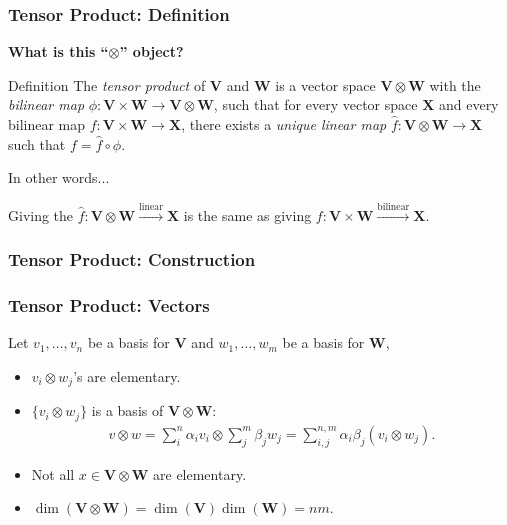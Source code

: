 \documentclass{beamer}
\theoremstyle{definition}
\newcommand{\V}{\mathbf{V}}
\newcommand{\W}{\mathbf{W}}
\newcommand{\X}{\mathbf{X}}
\newcommand{\lin}{\overset{\text{linear}}{\longrightarrow}}
\begin{document}
\begin{frame}


\frametitle{Tensor Product: Definition}	

\textbf{What is this ``$\otimes$'' object?}

\begin{block}{Definition \cite{Tor}}
The \textit{tensor product} of $\V$ and $\W$ is a vector space $\V \otimes \W$ with the \textit{bilinear map} $\phi : \V\times \W \longrightarrow \V\otimes \W$, such that for every vector space $\X$ and every bilinear map $f : \V \times \W \longrightarrow \X$, there exists a \textit{unique linear map} $\hat{f} : \V\otimes \W \longrightarrow \X$ such that $f = \hat{f} \circ \phi$.
\end{block}


\begin{block}{In other words...}

Giving the $\hat{f} : \V\otimes \W \lin \X$ is the same as giving $f : \V\times \W \stackrel{\text{bilinear}}{\longrightarrow} \X$.


\end{block}




\end{frame}


\begin{frame}[fragile]
\frametitle{Tensor Product: Construction}
\centering
\begin{center}
\end{center}
\end{frame}








\begin{frame}
\frametitle{Tensor Product: Vectors \tiny{\cite{cern}}}
Let $v_1,\dots,v_n$ be a basis for $\V$ and $w_1,\dots,w_m$ be a basis for $\W$,
\begin{itemize}
	\item $v_i \otimes w_j$'s are elementary.
	\item  
	$\{ v_i \otimes w_j\}$ is a basis of $\V\otimes \W$:
	\begin{align*}
	v\otimes w = \sum^n_i \alpha_i v_i \otimes \sum^m_j \beta_j w_j =  \sum^{n,m}_{i,j}\alpha_i\beta_j(v_i \otimes w_j).
	\end{align*}
	
	\item Not all $x \in \V\otimes \W$ are elementary.
	\item $\dim(\V\otimes \W) = \dim(\V)\dim(\W) = nm$.
\end{itemize}







\end{frame}
\end{document}
